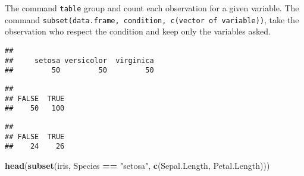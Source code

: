 \documentclass[
]{article}
\newenvironment{Shaded}{\begin{snugshade}}{\end{snugshade}}
\newcommand{\FloatTok}[1]{\textcolor[rgb]{0.00,0.00,0.81}{#1}}
\newcommand{\FunctionTok}[1]{\textcolor[rgb]{0.13,0.29,0.53}{\textbf{#1}}}
\newcommand{\NormalTok}[1]{#1}
\newcommand{\SpecialCharTok}[1]{\textcolor[rgb]{0.81,0.36,0.00}{\textbf{#1}}}
\newcommand{\StringTok}[1]{\textcolor[rgb]{0.31,0.60,0.02}{#1}}
\begin{document}
The command \texttt{table} group and count each observation for a given
variable. The command
\texttt{subset(data.frame,\ condition,\ c(vector\ of\ variable))}, take
the observation who respect the condition and keep only the variables
asked.

\begin{Shaded}
\end{Shaded}

\begin{verbatim}
## 
##     setosa versicolor  virginica 
##         50         50         50
\end{verbatim}

\begin{Shaded}
\end{Shaded}

\begin{verbatim}
## 
## FALSE  TRUE 
##    50   100
\end{verbatim}

\begin{Shaded}
\end{Shaded}

\begin{verbatim}
## 
## FALSE  TRUE 
##    24    26
\end{verbatim}

\begin{Shaded}
\begin{Highlighting}[]
\FunctionTok{head}\NormalTok{(}\FunctionTok{subset}\NormalTok{(iris, Species }\SpecialCharTok{==} \StringTok{"setosa"}\NormalTok{, }\FunctionTok{c}\NormalTok{(Sepal.Length, Petal.Length)))}
\end{Highlighting}
\end{Shaded}
\end{document}
